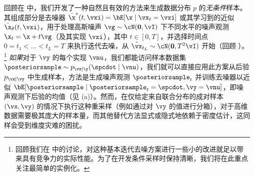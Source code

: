\documentclass[../../book-main_zh.tex]{subfiles}
\begin{document}
回顾在  中，我们开发了一种自然且有效的方法来生成数据分布 $p$ 的\textit{无条件}样本。其组成部分是去噪器 $\bar{\x}^\ast(t, \vxi) = \bE[ \x \mid \vx_t=\vxi ]$ 或其学习到的近似 $\bar{\x}_{\theta}(t, \vxi)$，用于处理高斯噪声 $\vg \sim \cN(\mathbf{0}, \vI)$ 下不同水平的噪声观测 $\x_t = \x + t \vg$（及其实现 $\vxi$），其中 $t \in [0, T]$，并选择时间点 $0 = t_1 < \dots < t_{L} = T$ 来执行迭代去噪，从 $\hat{\vx}_{t_L} \sim \cN(\mathbf{0}, T^2 \vI)$ 开始（回顾 ）。\footnote{回顾我们在  中的讨论，对这种基本迭代去噪方案进行一些小的改进就足以带来具有竞争力的实际性能。为了在开发条件采样时保持清晰，我们将在此重点关注最简单的实例化。}
\textit{如果}对于 $\vy$ 的每个实现 $\vnu$，我们都能访问样本数据集 $\posteriorsample \sim p_{\vx \mid \y}(\spcdot \mid \vnu)$，我们就可以直接应用此方案从后验 $p_{\vx \mid \vy}$ 中生成样本，方法是生成噪声观测 $\posteriorsample_t$ 并训练去噪器以近似 $\bE[ \posteriorsample \mid \posteriorsample_t=\spcdot, \vy=\vnu ]$，即噪声观测下后验的均值（见 (a)）。然而，在仅给定来自联合分布的成对样本 $(\vx, \vy)$ 的情况下执行这种重采样（例如通过对 $\vy$ 的值进行分箱），对于高维数据需要极其庞大的样本量，而其他替代方法显式或隐式地依赖于密度估计，这同样会受到维度灾难的困扰。
\end{document}

